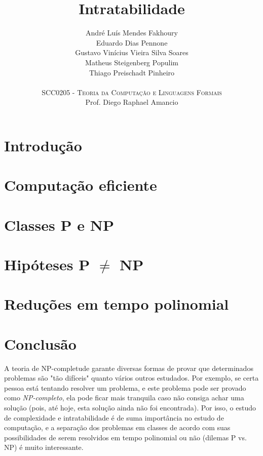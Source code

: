 \documentclass[12pt]{article}
\title{\textbf{Intratabilidade}} %
\date{}
\author{
André Luís Mendes Fakhoury\\ Eduardo Dias Pennone\\ Gustavo Vinícius Vieira Silva Soares\\ Matheus Steigenberg Populim\\ Thiago Preischadt Pinheiro\\\\
\textsc{SCC0205 - Teoria da Computação e Linguagens Formais}\\
Prof. Diego Raphael Amancio
}
\begin{document}
\setlength{\droptitle}{-5em}
\maketitle

\section{Introdução}

\section{Computação eficiente}
\section{Classes P e NP}
\section{Hipóteses P $\neq$ NP}
\section{Reduções em tempo polinomial}





\section{Conclusão}

A teoria de NP-completude garante diversas formas de provar que determinados problemas são "tão difíceis" quanto vários outros estudados. Por exemplo, se certa pessoa está tentando resolver um problema, e este problema pode ser provado como \textit{NP-completo}, ela pode ficar mais tranquila caso não consiga achar uma solução (pois, até hoje, esta solução ainda não foi encontrada). Por isso, o estudo de complexidade e intratabilidade é de suma importância no estudo de computação, e a separação dos problemas em classes de acordo com suas possibilidades de serem resolvidos em tempo polinomial ou não (dilemas P vs. NP) é muito interessante.

\nocite{*}






\end{document}
